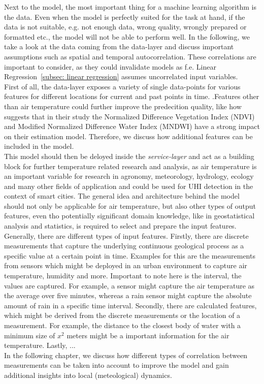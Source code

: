 Next to the model, the most important thing for a machine learning algorithm is the data. Even when the model is perfectly suited for the task at hand, if the data is not suitable, e.g. not enough data, wrong quality, wrongly prepared or formatted etc., the model will not be able to perform well. In the following, we take a look at the data coming from the data-layer and discuss important assumptions such as spatial and temporal autocorrelation. These correlations are important to consider, as they could invalidate models as f.e. Linear Regression~\ref{subsec: linear regression} assumes uncorrelated input variables.\\
First of all, the data-layer exposes a variety of single data-points for various features for different locations for current and past points in time.
.Features other than air temperature could further improve the predecition quality, like how~\cite{alonso2020new} suggests that in their study the Normalized Difference Vegetation Index (NDVI) and Modified Normalized Difference Water Index (MNDWI) have a strong impact on their estimation model. Therefore, we discuss how additional features can be included in the model.\\
This model should then be deloyed inside the \textit{service-layer} and act as a building block for further temperature related research and analysis, as air temperature is an important variable for research in agronomy, meteorology, hydrology, ecology and many other fields of application and could be used for UHI detection in the context of smart cities. The general idea and architecture behind the model should not only be applicable for air temperature, but also other types of output features, even tho potentially significant domain knowledge, like in geostatistical analysis and statistics, is required to select and prepare the input features.\\
Generally, there are different types of input features. Firstly, there are discrete measurements that capture the underlying continuous geological process as a specific value at a certain point in time. Examples for this are the measurements from sensors which might be deployed in an urban environment to capture air temperature, humidity and more. Important to note here is the interval, the values are captured. For example, a sensor might capture the air temperature as the average over five minutes, whereas a rain sensor might capture the absolute amount of rain in a specific time interval. Secondly, there are calculated features, which might be derived from the discrete measurements or the location of a measurement. For example, the distance to the closest body of water with a minimum size of $x^2$ meters might be a important information for the air temperature. Lastly, ...\\
In the following chapter, we discuss how different types of correlation between measurements can be taken into account to improve the model and gain additional insights into local (meteological) dynamics.

